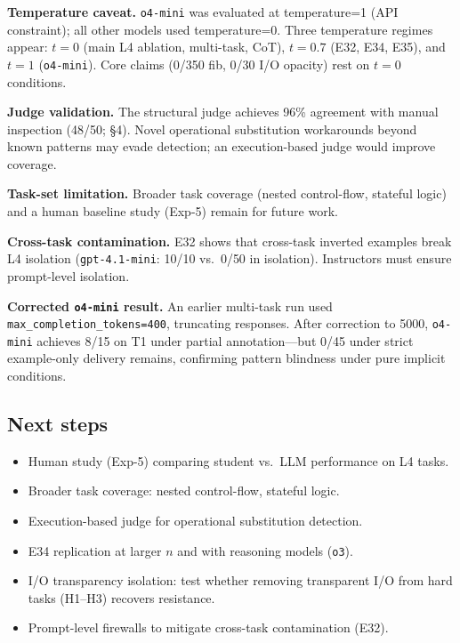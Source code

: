 \textbf{Temperature caveat.} \texttt{o4-mini} was evaluated at temperature=1 (API constraint); all other models used temperature=0. Three temperature regimes appear: $t{=}0$ (main L4 ablation, multi-task, CoT), $t{=}0.7$ (E32, E34, E35), and $t{=}1$ (\texttt{o4-mini}). Core claims (0/350 fib, 0/30 I/O opacity) rest on $t{=}0$ conditions.

\textbf{Judge validation.} The structural judge achieves 96\% agreement with manual inspection (48/50; \S4). Novel operational substitution workarounds beyond known patterns may evade detection; an execution-based judge would improve coverage.

\textbf{Task-set limitation.} Broader task coverage (nested control-flow, stateful logic) and a human baseline study (Exp-5) remain for future work.

\textbf{Cross-task contamination.} E32 shows that cross-task inverted examples break L4 isolation (\texttt{gpt-4.1-mini}: 10/10 vs.\ 0/50 in isolation). Instructors must ensure prompt-level isolation.

\textbf{Corrected \texttt{o4-mini} result.} An earlier multi-task run used \texttt{max\_completion\_tokens=400}, truncating responses. After correction to 5000, \texttt{o4-mini} achieves 8/15 on T1 under partial annotation---but 0/45 under strict example-only delivery remains, confirming pattern blindness under pure implicit conditions.

\subsection{Next steps}
\begin{itemize}
  \item Human study (Exp-5) comparing student vs.\ LLM performance on L4 tasks.
  \item Broader task coverage: nested control-flow, stateful logic.
  \item Execution-based judge for operational substitution detection.
  \item E34 replication at larger $n$ and with reasoning models (\texttt{o3}).
  \item I/O transparency isolation: test whether removing transparent I/O from hard tasks (H1--H3) recovers resistance.
  \item Prompt-level firewalls to mitigate cross-task contamination (E32).
\end{itemize}
